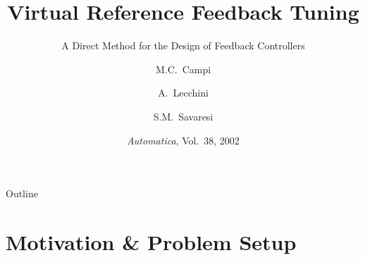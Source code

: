 \documentclass[aspectratio=169]{beamer}
\title[VRFT]{Virtual Reference Feedback Tuning}
\subtitle{A Direct Method for the Design of Feedback Controllers}
\author[Campi, Lecchini, Savaresi]{M.C.~Campi \and A.~Lecchini \and S.M.~Savaresi}
\institute[]{University of Brescia \quad UCLouvain \quad Politecnico di Milano}
\date{\textit{Automatica}, Vol.~38, 2002}
\begin{document}

\begin{frame}[plain]
  \titlepage
\end{frame}

\begin{frame}{Outline}
  \tableofcontents
\end{frame}

\section{Motivation \& Problem Setup}
\end{document}

